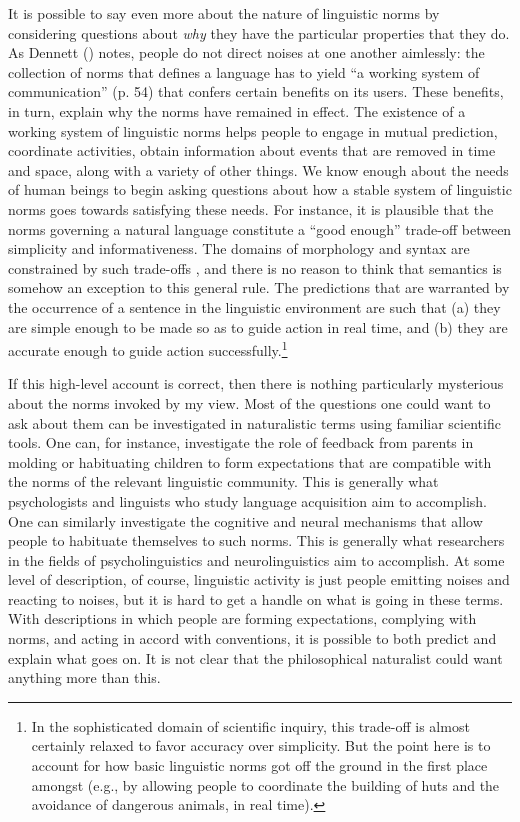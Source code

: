 It is possible to say even more about the nature of linguistic norms by considering questions about \textit{why} they have the particular properties that they do. As Dennett (\citeyear{Dennett:2010}) notes, people do not direct noises at one another aimlessly: the collection of norms that defines a language has to yield ``a working system of communication'' (p. 54) that confers certain benefits on its users. These benefits, in turn, explain why the norms have remained in effect. The existence of a working system of linguistic norms helps people to engage in mutual prediction, coordinate activities, obtain information about events that are removed in time and space, along with a variety of other things. We know enough about the needs of human beings to begin asking questions about how a stable system of linguistic norms goes towards satisfying these needs. For instance, it is plausible that the norms governing a natural language constitute a ``good enough'' trade-off between simplicity and informativeness. The domains of morphology and syntax are constrained by such trade-offs \citep{Frank:2016}, and there is no reason to think that semantics is somehow an exception to this general rule. The predictions that are warranted by the occurrence of a sentence in the linguistic environment are such that (a) they are simple enough to be made so as to guide action in real time, and (b) they are accurate enough to guide action successfully.\footnote{In the sophisticated domain of scientific inquiry, this trade-off is almost certainly relaxed to favor accuracy over simplicity. But the point here is to account for how basic linguistic norms got off the ground in the first place amongst (e.g., by allowing people to coordinate the building of huts and the avoidance of dangerous animals, in real time).} 

If this high-level account is correct, then there is nothing particularly mysterious about the norms invoked by my view. Most of the questions one could want to ask about them can be investigated in naturalistic terms using familiar scientific tools. One can, for instance, investigate the role of feedback from parents in molding or habituating children to form expectations that are compatible with the norms of the relevant linguistic community. This is generally what psychologists and linguists who study language acquisition aim to accomplish. One can similarly investigate the cognitive and neural mechanisms that allow people to habituate themselves to such norms. This is generally what researchers in the fields of psycholinguistics and neurolinguistics aim to accomplish. At some level of description, of course, linguistic activity is just people emitting noises and reacting to noises, but it is hard to get a handle on what is going in these terms. With descriptions in which people are forming expectations, complying with norms, and acting in accord with conventions, it is possible to both predict and explain what goes on. It is not clear that the philosophical naturalist could want anything more than this. 

